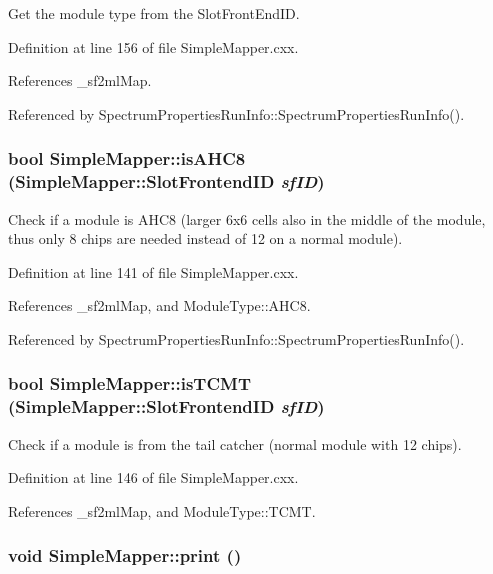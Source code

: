 Get the module type from the SlotFrontEndID. 

Definition at line 156 of file SimpleMapper.cxx.

References \_\-sf2mlMap.

Referenced by SpectrumPropertiesRunInfo::SpectrumPropertiesRunInfo().\hypertarget{class_simple_mapper_a02936c8c25f05737945901618a777515}{
\subsubsection[{isAHC8}]{\setlength{\rightskip}{0pt plus 5cm}bool SimpleMapper::isAHC8 ({\bf SimpleMapper::SlotFrontendID} {\em sfID})}}
\label{class_simple_mapper_a02936c8c25f05737945901618a777515}


Check if a module is AHC8 (larger 6x6 cells also in the middle of the module, thus only 8 chips are needed instead of 12 on a normal module). 

Definition at line 141 of file SimpleMapper.cxx.

References \_\-sf2mlMap, and ModuleType::AHC8.

Referenced by SpectrumPropertiesRunInfo::SpectrumPropertiesRunInfo().\hypertarget{class_simple_mapper_a09cf4f914abaad39fc4cc039f4e41ea2}{
\subsubsection[{isTCMT}]{\setlength{\rightskip}{0pt plus 5cm}bool SimpleMapper::isTCMT ({\bf SimpleMapper::SlotFrontendID} {\em sfID})}}
\label{class_simple_mapper_a09cf4f914abaad39fc4cc039f4e41ea2}


Check if a module is from the tail catcher (normal module with 12 chips). 

Definition at line 146 of file SimpleMapper.cxx.

References \_\-sf2mlMap, and ModuleType::TCMT.\hypertarget{class_simple_mapper_a0cfad0a5093ba57a9540b99f850cd474}{
\subsubsection[{print}]{\setlength{\rightskip}{0pt plus 5cm}void SimpleMapper::print ()}}
\label{class_simple_mapper_a0cfad0a5093ba57a9540b99f850cd474}


